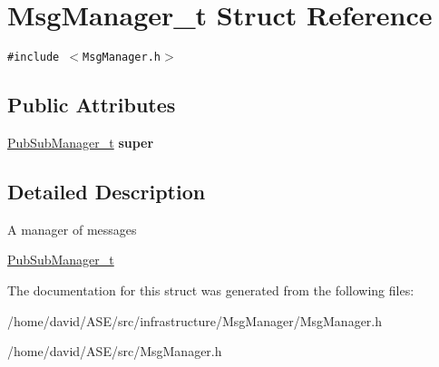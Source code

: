 \hypertarget{structMsgManager__t}{
\section{MsgManager\_\-t Struct Reference}
\label{structMsgManager__t}
}
{\tt \#include $<$MsgManager.h$>$}

\subsection*{Public Attributes}
\begin{CompactItemize}
\item 
\hypertarget{structMsgManager__t_9bde88cff3f54cff7194c8ace1b4930c}{
\hyperlink{structPubSubManager__t}{PubSubManager\_\-t} \textbf{super}}
\label{structMsgManager__t_9bde88cff3f54cff7194c8ace1b4930c}

\end{CompactItemize}


\subsection{Detailed Description}
A manager of messages

\hyperlink{structPubSubManager__t}{PubSubManager\_\-t} 

The documentation for this struct was generated from the following files:\begin{CompactItemize}
\item 
/home/david/ASE/src/infrastructure/MsgManager/MsgManager.h\item 
/home/david/ASE/src/MsgManager.h\end{CompactItemize}
